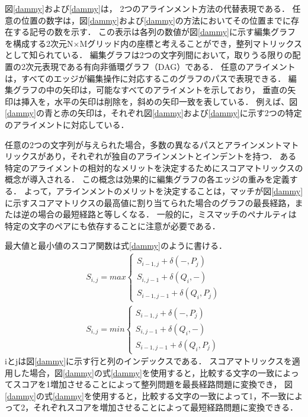 図\ref{dammy}および\ref{dammy}は， 2つのアラインメント方法の代替表現である．
任意の位置の数字は，図\ref{dammy}および\ref{dammy}の方法においてその位置までに存在する記号の数を示す．
この表示は各列の数値が図\ref{dammy}に示す編集グラフを構成する2次元N×Mグリッド内の座標と考えることができ，整列マトリックスとして知られている．
編集グラフは2つの文字列間において，取りうる限りの配置の2次元表現である有向非循環グラフ（DAG）である．
任意のアライメントは，すべてのエッジが編集操作に対応するこのグラフのパスで表現できる．
編集グラフの中の矢印は，可能なすべてのアライメントを示しており，
垂直の矢印は挿入を，水平の矢印は削除を，斜めの矢印一致を表している．
例えば、図\ref{dammy}の青と赤の矢印は，それぞれ図\ref{dammy}および\ref{dammy}に示す2つの特定のアライメントに対応している．

任意の2つの文字列が与えられた場合，多数の異なるパスとアラインメントマトリックスがあり，それぞれが独自のアラインメントとインデントを持つ．
ある特定のアライメントの相対的なメリットを決定するためにスコアマトリックスの概念が導入される．
この概念は効果的に編集グラフの各エッジの重みを定義する．
よって，アラインメントのメリットを決定することは，マッチが図\ref{dammy}に示すスコアマトリクスの最高値に割り当てられた場合のグラフの最長経路，または逆の場合の最短経路と等しくなる．
一般的に，ミスマッチのペナルティは特定の文字のペアにも依存することに注意が必要である．

最大値と最小値のスコア関数は式\ref{dammy}のように書ける．
\begin{subequations}
\begin{align}
S_{i,j}= max \left \{
\begin{array}{l}
S_{i-1,j}+\delta(-,P_{j}) \\
S_{i,j-1}+\delta(Q_{i},-) \\
S_{i-1,j-1}+\delta(Q_{i},P_{j})
\end{array}
\right.\label{eq:maxscore} \\
S_{i,j}= min \left \{
\begin{array}{l}
S_{i-1,j}+\delta(-,P_{j}) \\
S_{i,j-1}+\delta(Q_{i},-) \\
S_{i-1,j-1}+\delta(Q_{i},P_{j})
\end{array}
\right.\label{eq:minscore}
\end{align}
\label{eq:minmaxscore}
\end{subequations}
iとjは図\ref{dammy}に示す行と列のインデックスである．
スコアマトリックスを適用した場合，図\ref{dammy}の式\ref{dammy}を使用すると，比較する文字の一致によってスコアを1増加させることによって整列問題を最長経路問題に変換でき，
図\ref{dammy}の式\ref{dammy}を使用すると，比較する文字の一致によって1，不一致によって2，それぞれスコアを増加させることによって最短経路問題に変換できる．

